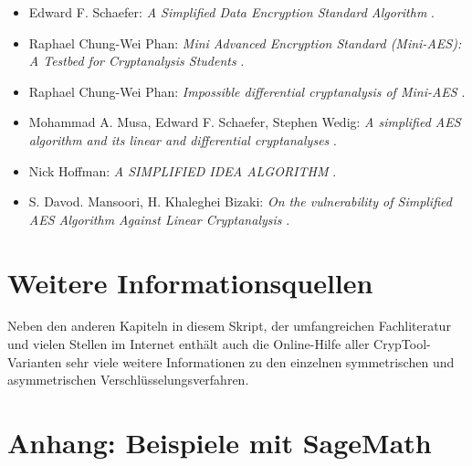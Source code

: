 \begin{refsegment}
\begin{itemize}

\item Edward F. Schaefer: {\em A Simplified Data Encryption Standard Algorithm}
      \cite{Schaefer1996}.

\item Raphael Chung-Wei Phan: {\em Mini Advanced Encryption Standard (Mini-AES):
                                   A Testbed for Cryptanalysis Students}
      \cite{Phan2002}.

\item Raphael Chung-Wei Phan: {\em Impossible differential cryptanalysis of Mini-AES}
      \cite{Phan2003}.

\item Mohammad A. Musa, Edward F. Schaefer, Stephen Wedig:
      {\em A simplified AES algorithm and its linear and differential cryptanalyses}
      \cite{Musa2003}.

\item Nick Hoffman: {\em A SIMPLIFIED IDEA ALGORITHM}
      \cite{Hoffman2006}.

\item S. Davod. Mansoori, H. Khaleghei Bizaki:
      {\em On the vulnerability of Simplified AES Algorithm Against Linear Cryptanalysis}
      \cite{Mansoori2007}.

\end{itemize}



\section{Weitere Informationsquellen}

Neben den anderen Kapiteln in diesem Skript, der umfangreichen Fachliteratur
und vielen Stellen im Internet enthält auch die Online-Hilfe aller
CrypTool-Varianten sehr viele weitere Informationen zu den
einzelnen symmetrischen und asymmetrischen Verschlüsselungsverfahren.




\hypertarget{CM_Appendix_SageCode}{}
\section{Anhang: Beispiele mit SageMath}
\label{CM_Sage_samples}


\end{refsegment}
